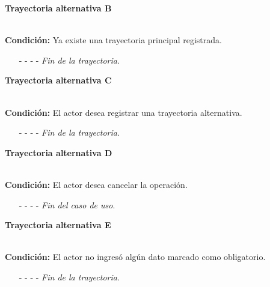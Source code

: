 \hypertarget{CU12-1-1-2:TAB}{\textbf{Trayectoria alternativa B}}\\
\noindent \textbf{Condición:} Ya existe una trayectoria principal registrada.
\begin{enumerate}
	\UCpaso[\UCsist] Selecciona automáticamente la opción ''Alternativa'' del campo ''Tipo''.
	\UCpaso[\UCsist] Inhabilita el campo ''tipo''.
	\UCpaso[\UCsist] Muestra el campo de condición.
	\UCpaso Continúa con el paso \ref{CU12.1.1.2-TB3} de la trayectoria alternativa C.
	\item[- -] - - {\em {Fin de la trayectoria}}.%
\end{enumerate}
\hypertarget{CU12-1-1-2:TAC}{\textbf{Trayectoria alternativa C}}\\
\noindent \textbf{Condición:} El actor desea registrar una trayectoria alternativa.
\begin{enumerate}
	\UCpaso[\UCactor] Selecciona la opción ''Alternativa'' del campo ''Tipo''.
	\UCpaso[\UCsist] Muestra el campo de condición.
	\UCpaso[\UCactor] Ingresa la condición de la trayectoria. \label{CU12.1.1.2-TB3}
	\UCpaso[\UCactor] Selecciona si en la trayectoria se termina el caso de uso.
	\UCpaso Continúa con el paso \ref{CU12.1.1.2-P18} de la trayectoria principal.
	\item[- -] - - {\em {Fin de la trayectoria}}.%
\end{enumerate}
\hypertarget{CU12-1-1-2:TAD}{\textbf{Trayectoria alternativa D}}\\
\noindent \textbf{Condición:} El actor desea cancelar la operación.
\begin{enumerate}
	\UCpaso[\UCactor] Solicita cancelar la operación oprimiendo el botón  de la pantalla .
	\UCpaso[\UCsist] Muestra la pantalla .
	\item[- -] - - {\em {Fin del caso de uso}}.%
\end{enumerate}
\hypertarget{CU12-1-1-2:TAE}{\textbf{Trayectoria alternativa E}}\\
\noindent \textbf{Condición:} El actor no ingresó algún dato marcado como obligatorio.
\begin{enumerate}
	\UCpaso[\UCsist] Muestra el mensaje  señalando el campo que presenta el error en la pantalla .
	\UCpaso Regresa al paso \ref{CU12.1.1.2-P15} de la trayectoria principal.
	\item[- -] - - {\em {Fin de la trayectoria}}.%
\end{enumerate}
